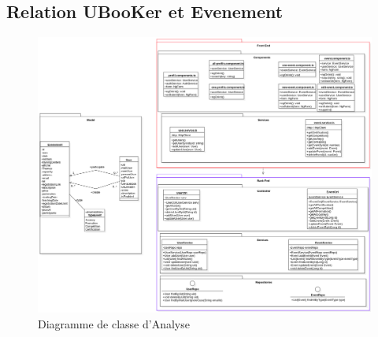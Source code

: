 \documentclass[12pt]{report}
\begin{document}
\begin{landscape}
\subsection{Relation UBooKer et Evenement}
\begin{figure}[hbtp]
    \centering
    \includegraphics[width=1\textwidth]{Diagramme de Classe Conception d'event}
    \caption{Diagramme de classe d'Analyse}
    \label{fig:classe analyse 2}
\end{figure}
\end{landscape}
\restoregeometry
\end{document}
